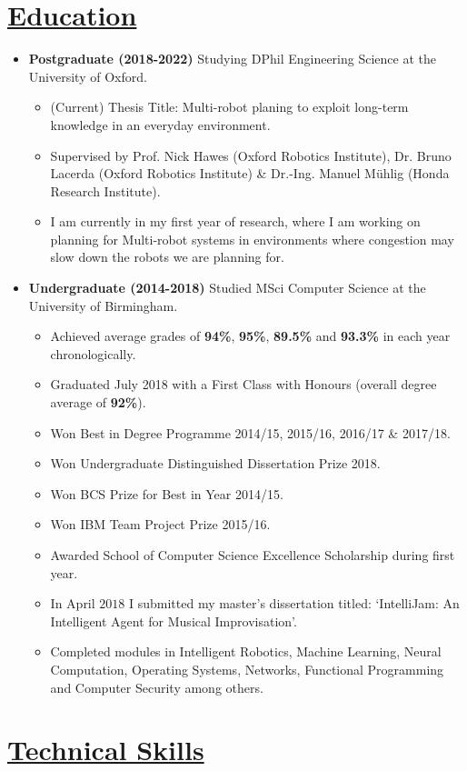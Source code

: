 \documentclass[11pt]{article}
\begin{document}
	\vspace{-30pt}
	\hspace{-100pt}\section*{\underline{Education}}
		\begin {itemize}
			\item \textbf{Postgraduate (2018-2022)} Studying DPhil Engineering Science at the University of Oxford.
				\begin{itemize}
					\item (Current) Thesis Title: Multi-robot planing to exploit long-term knowledge in an everyday environment.
					\item Supervised by Prof. Nick Hawes (Oxford Robotics Institute), Dr. Bruno Lacerda (Oxford Robotics Institute) \& Dr.-Ing. Manuel M{\"u}hlig (Honda Research Institute).
					\item I am currently in my first year of research, where I am working on planning for Multi-robot systems in environments where congestion may slow down the robots we are planning for.
				\end{itemize}
		
			\item \textbf{Undergraduate (2014-2018)} Studied MSci Computer Science at the University of Birmingham.
				\begin{itemize}
					\item Achieved average grades of \textbf{94\%}, \textbf{95\%}, \textbf{89.5\%} and \textbf{93.3\%} in each year chronologically.
					\item Graduated July 2018 with a First Class with Honours (overall degree average of \textbf{92\%}).
					\item Won Best in Degree Programme 2014/15, 2015/16, 2016/17 \& 2017/18.
					\item Won Undergraduate Distinguished Dissertation Prize 2018.
					\item Won BCS Prize for Best in Year 2014/15.
					\item Won IBM Team Project Prize 2015/16.
					\item Awarded School of Computer Science Excellence Scholarship during first year.
					\item In April $2018$ I submitted my master's dissertation titled: `IntelliJam: An Intelligent Agent for Musical Improvisation'.
					\item Completed modules in Intelligent Robotics, Machine Learning, Neural Computation, Operating Systems, Networks, Functional Programming and Computer Security among others.
				\end{itemize}
			
		\end{itemize}
	\vspace{-20pt}
	\hspace{-100pt}\section*{\underline{Technical Skills}}
\end{document}
